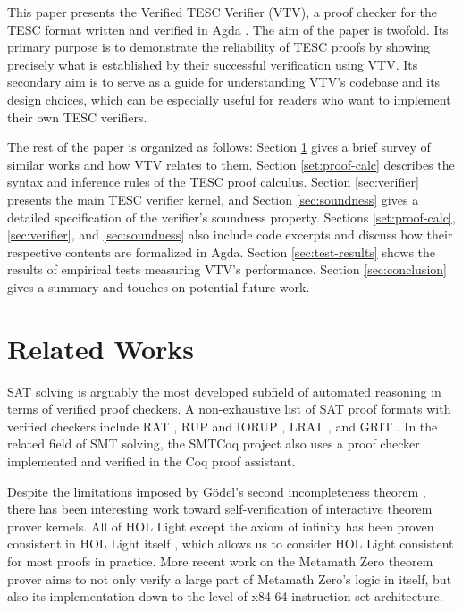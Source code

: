 \documentclass[12pt]{article}
\begin{document}
This paper presents the Verified TESC Verifier (VTV), a proof checker for  
the TESC format written and verified in Agda \cite{bove2009brief}. 
The aim of the paper is twofold. Its primary purpose is to demonstrate the 
reliability of TESC proofs by showing precisely what is established by their successful 
verification using VTV. Its secondary aim is to serve as a guide for understanding 
VTV's codebase and its design choices, which can be especially useful for readers 
who want to implement their own TESC verifiers.

The rest of the paper is organized as follows:
Section \ref{sec:rel-works} gives a brief survey of similar works and how VTV relates to them.
Section \ref{set:proof-calc} describes the syntax and inference rules of the TESC proof calculus.
Section \ref{sec:verifier} presents the main TESC verifier kernel, and
Section \ref{sec:soundness} gives a detailed specification of the verifier's soundness property.
Sections \ref{set:proof-calc}, \ref{sec:verifier}, and \ref{sec:soundness} also include code 
excerpts and discuss how their respective contents are formalized in Agda.
Section \ref{sec:test-results} shows the  results of empirical tests measuring VTV's performance.
Section \ref{sec:conclusion} gives a summary and touches on potential future work.

\section{Related Works} \label{sec:rel-works}

SAT solving is arguably the most developed subfield of automated reasoning in terms of 
verified proof checkers. A non-exhaustive list of SAT proof formats with verified checkers
include RAT \cite{heule2013verifying}, RUP and IORUP \cite{heule2014bridging},
LRAT \cite{cruz2017lrat}, and GRIT \cite{cruz2017grit}. In the related field of SMT solving,
the SMTCoq project \cite{armand2011modular} also uses a proof checker implemented and
verified in the Coq proof assistant.

Despite the limitations imposed by G\"odel's second incompleteness theorem \cite{godel1931formal},
there has been interesting work toward self-verification of interactive 
theorem prover kernels. All of HOL Light except the axiom of infinity has been 
proven consistent in HOL Light itself \cite{harrison2006towards}, which allows us to consider HOL Light
consistent for most proofs in practice. More recent work on the Metamath Zero \cite{carneiro2019metamath}
theorem prover aims to not only verify a large part of Metamath Zero's logic in itself, 
but also its implementation down to the level of x84-64 instruction set architecture. 
\end{document}
